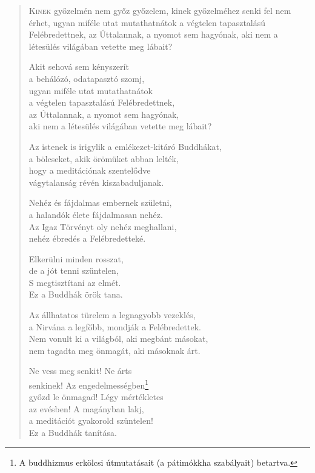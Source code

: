 
\begin{verse}

{\par%
\lettrine{K}{inek} {\LettrineTextFont győzelmén nem győz győzelem,}\newline
kinek győzelméhez senki fel nem érhet,\newline
ugyan miféle utat mutathatnátok\verselinebreak
a végtelen tapasztalású Felébredettnek,\verselinebreak
az Úttalannak, a nyomot sem hagyónak,\verselinebreak
aki nem a létesülés világában vetette meg lábait?
\par}

 Akit sehová sem kényszerít\\
a behálózó, odatapasztó szomj,\\
ugyan miféle utat mutathatnátok\\
a végtelen tapasztalású Felébredettnek,\\
az Úttalannak, a nyomot sem hagyónak,\\
aki nem a létesülés világában vetette meg lábait?

 Az istenek is irigylik a emlékezet-kitáró Buddhákat,\\
a bölcseket, akik örömüket abban lelték,\\
hogy a meditációnak szentelődve\\
vágytalanság révén kiszabaduljanak.

 Nehéz és fájdalmas embernek születni,\\
a halandók élete fájdalmasan nehéz.\\
Az Igaz Törvényt oly nehéz meghallani,\\
nehéz ébredés a Felébredetteké.

 Elkerülni minden rosszat,\\
de a jót tenni szüntelen,\\
S megtisztítani az elmét.\\
Ez a Buddhák örök tana.

 Az állhatatos türelem a legnagyobb vezeklés,\\
a Nirvána a legfőbb, mondják a Felébredettek.\\
Nem vonult ki a világból, aki megbánt másokat,\\
nem tagadta meg önmagát, aki másoknak árt.

 Ne vess meg senkit! Ne árts\\
senkinek! Az engedelmességben\footnote{A buddhizmus erkölcsi útmutatásait (a pátimókkha szabályait) betartva.}\\
győzd le önmagad! Légy mértékletes\\
az evésben! A magányban lakj,\\
a meditációt gyakorold szüntelen!\\
Ez a Buddhák tanítása.


\end{verse}
